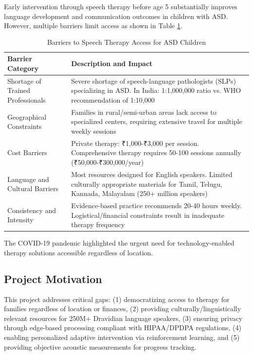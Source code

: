 \documentclass[12pt,a4paper]{article}
\begin{document}
Early intervention through speech therapy before age 5 substantially improves language development and communication outcomes in children with ASD. However, multiple barriers limit access as shown in Table \ref{tab:barriers}.

\begin{table}[H]
\centering
\caption{Barriers to Speech Therapy Access for ASD Children}
\label{tab:barriers}
\begin{tabular}{p{4cm}p{10cm}}
\toprule
\textbf{Barrier Category} & \textbf{Description and Impact} \\
\midrule
Shortage of Trained Professionals & Severe shortage of speech-language pathologists (SLPs) specializing in ASD. In India: 1:1,000,000 ratio vs. WHO recommendation of 1:10,000 \\
\hline
Geographical Constraints & Families in rural/semi-urban areas lack access to specialized centers, requiring extensive travel for multiple weekly sessions \\
\hline
Cost Barriers & Private therapy: ₹1,000-₹3,000 per session. Comprehensive therapy requires 50-100 sessions annually (₹50,000-₹300,000/year) \\
\hline
Language and Cultural Barriers & Most resources designed for English speakers. Limited culturally appropriate materials for Tamil, Telugu, Kannada, Malayalam (250+ million speakers) \\
\hline
Consistency and Intensity & Evidence-based practice recommends 20-40 hours weekly. Logistical/financial constraints result in inadequate therapy frequency \\
\bottomrule
\end{tabular}
\end{table}

The COVID-19 pandemic highlighted the urgent need for technology-enabled therapy solutions accessible regardless of location.

\subsection{Project Motivation}

This project addresses critical gaps: (1) democratizing access to therapy for families regardless of location or finances, (2) providing culturally/linguistically relevant resources for 250M+ Dravidian language speakers, (3) ensuring privacy through edge-based processing compliant with HIPAA/DPDPA regulations, (4) enabling personalized adaptive intervention via reinforcement learning, and (5) providing objective acoustic measurements for progress tracking.
\end{document}
